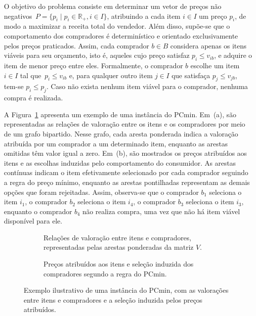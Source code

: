 O objetivo do problema consiste em determinar um vetor de preços não negativos~$P = \{p_i \mid p_i \in \mathbb{R}_+, i \in I\}$, atribuindo a cada item $i \in I$ um preço $p_i$, de modo a maximizar a receita total do vendedor. Além disso, supõe-se que o comportamento dos compradores é determinístico e orientado exclusivamente pelos preços praticados. Assim, cada comprador $b \in B$ considera apenas os itens viáveis para seu orçamento, isto é, aqueles cujo preço satisfaz $p_i \leq v_{ib}$, e adquire o item de menor preço entre eles. Formalmente, o comprador $b$ escolhe um item $i \in I$ tal que~$p_i \leq v_{ib}$ e, para qualquer outro item $j \in I$ que satisfaça $p_j \leq v_{jb}$, tem-se $p_i \leq p_j$. Caso não exista nenhum item viável para o comprador, nenhuma compra é realizada.


A Figura~\ref{fig:exemploPCmin} apresenta um exemplo de uma instância do PCmin. Em~(a), são representadas as relações de valoração entre os itens e os compradores por meio de um grafo bipartido. Nesse grafo, cada aresta ponderada indica a valoração atribuída por um comprador a um determinado item, enquanto as arestas omitidas têm valor igual a zero. Em~(b), são mostrados os preços atribuídos aos itens e as escolhas induzidas pelo comportamento do consumidor. As arestas contínuas indicam o item efetivamente selecionado por cada comprador seguindo a regra do preço mínimo, enquanto as arestas pontilhadas representam as demais opções que foram rejeitadas. Assim, observa-se que o comprador $b_1$ seleciona o item $i_1$, o comprador $b_2$ seleciona o item $i_4$, o comprador $b_3$ seleciona o item $i_3$, enquanto o comprador $b_4$ não realiza compra, uma vez que não há item viável disponível para ele.

\begin{figure}[H]
\centering

\begin{subfigure}[t]{0.45\textwidth}
    \centering
    \vspace*{-63.5mm}
    \conjuntoItensValorados
    \vspace*{6mm}
    \caption{Relações de valoração entre itens e compradores, representadas pelas arestas ponderadas da matriz $V$.}
\end{subfigure}
\hfill
\begin{subfigure}[t]{0.45\textwidth}
    \centering
    \conjuntoItensPrecificados
    \caption{Preços atribuídos aos itens e seleção induzida dos compradores segundo a regra do PCmin.}
\end{subfigure}

\caption{Exemplo ilustrativo de uma instância do PCmin, com as valorações entre itens e compradores e a seleção induzida pelos preços atribuídos.}
\label{fig:exemploPCmin}
\end{figure}

